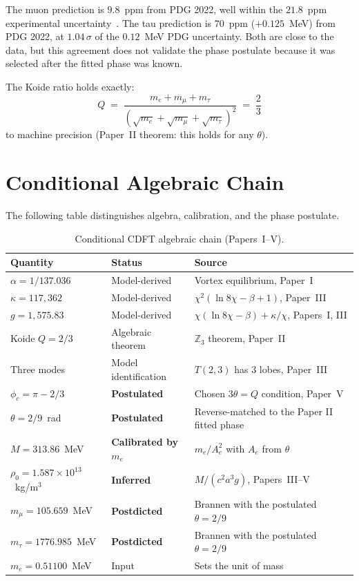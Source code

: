 \documentclass[11pt]{article}
\begin{document}
The muon prediction is $9.8$~ppm from PDG 2022, well within the
$21.8$~ppm experimental uncertainty~\cite{PDG2022}.
The tau prediction is $70$~ppm ($+0.125$~MeV) from PDG 2022,
at $1.04\,\sigma$ of the $0.12$~MeV PDG uncertainty.
Both are close to the data, but this agreement does not validate the phase
postulate because it was selected after the fitted phase was known.

The Koide ratio holds exactly:
\begin{equation}
  Q \;=\; \frac{m_e + m_\mu + m_\tau}{(\sqrt{m_e}+\sqrt{m_\mu}+\sqrt{m_\tau})^2}
  \;=\; \frac{2}{3}
  \label{eq:Koide_check}
\end{equation}
to machine precision (Paper~II theorem: this holds for any $\theta$).


\section{Conditional Algebraic Chain}
\label{sec:chain}

The following table distinguishes algebra, calibration, and the phase postulate.

\begin{table}[h]
  \caption{Conditional CDFT algebraic chain (Papers~I--V).}
  \label{tab:chain}
  \begin{tabular}{llp{6cm}}
    \toprule
    Quantity & Status & Source \\
    \midrule
    $\alpha = 1/137.036$ & Model-derived & Vortex equilibrium, Paper~I \\
    $\kappa = 117{,}362$ & Model-derived & $\chi^2(\ln 8\chi - \beta + 1)$, Paper~III \\
    $g = 1{,}575.83$ & Model-derived & $\chi(\ln 8\chi - \beta) + \kappa/\chi$, Papers~I, III \\
    Koide $Q = 2/3$ & Algebraic theorem & $\mathbb{Z}_3$ theorem, Paper~II \\
    Three modes & Model identification & $T(2,3)$ has 3 lobes, Paper~III \\
    $\phi_c = \pi - 2/3$ & \textbf{Postulated} & Chosen $3\theta=Q$ condition, Paper~V \\
    $\theta = 2/9$~rad & \textbf{Postulated} & Reverse-matched to the Paper II fitted phase \\
    $M = 313.86$~MeV & \textbf{Calibrated by $m_e$} & $m_e/A_e^2$ with $A_e$ from $\theta$ \\
    $\rho_0 = 1.587 \times 10^{13}$~kg/m$^3$ & \textbf{Inferred} & $M/(c^2 a^3 g)$, Papers~III--V \\
    $m_\mu = 105.659$~MeV & \textbf{Postdicted} & Brannen with the postulated $\theta = 2/9$ \\
    $m_\tau = 1776.985$~MeV & \textbf{Postdicted} & Brannen with the postulated $\theta = 2/9$ \\
    \midrule
    $m_e = 0.51100$~MeV & Input & Sets the unit of mass \\
    \bottomrule
  \end{tabular}
\end{table}
\end{document}
